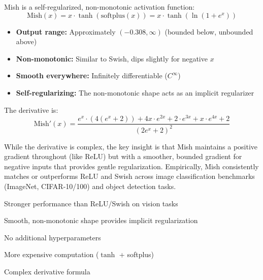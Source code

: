 Mish \cite{misra2019mish} is a self-regularized, non-monotonic activation function:
\begin{equation}
\text{Mish}(x) = x \cdot \tanh(\text{softplus}(x)) = x \cdot \tanh(\ln(1 + e^x))
\end{equation}

\begin{properties}
\begin{itemize}
    \item \textbf{Output range:} Approximately $(-0.308, \infty)$ (bounded below, unbounded above)
    \item \textbf{Non-monotonic:} Similar to Swish, dips slightly for negative $x$
    \item \textbf{Smooth everywhere:} Infinitely differentiable ($C^\infty$)
    \item \textbf{Self-regularizing:} The non-monotonic shape acts as an implicit regularizer
\end{itemize}
\end{properties}

The derivative is:
\begin{equation}
\text{Mish}'(x) = \frac{e^x \cdot (4(e^x + 2)) + 4x \cdot e^{2x} + 2 \cdot e^{3x} + x \cdot e^{4x} + 2}{(2e^x + 2)^2}
\end{equation}

While the derivative is complex, the key insight is that Mish maintains a positive gradient throughout (like ReLU) but with a smoother, bounded gradient for negative inputs that provides gentle regularization. Empirically, Mish consistently matches or outperforms ReLU and Swish across image classification benchmarks (ImageNet, CIFAR-10/100) and object detection tasks.

\begin{advantages}
    \item Stronger performance than ReLU/Swish on vision tasks
    \item Smooth, non-monotonic shape provides implicit regularization
    \item No additional hyperparameters
\end{advantages}

\begin{disadvantages}
    \item More expensive computation ($\tanh$ + softplus)
    \item Complex derivative formula
\end{disadvantages}

